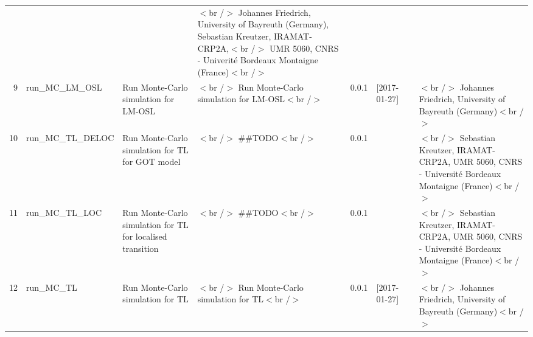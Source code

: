 \begin{table}[ht]
\begin{tabular}{rlllllll}
 &  &  & $<$br /$>$ Johannes Friedrich, University of Bayreuth (Germany), Sebastian Kreutzer, IRAMAT-CRP2A,$<$br /$>$ UMR 5060, CNRS - Univerité Bordeaux Montaigne (France)$<$br /$>$ \\ 
  9 & run\_MC\_LM\_OSL & Run Monte-Carlo simulation for LM-OSL & $<$br /$>$ Run Monte-Carlo simulation for LM-OSL$<$br /$>$ & 0.0.1 & [2017-01-27]
 &  & $<$br /$>$ Johannes Friedrich, University of Bayreuth (Germany)$<$br /$>$ \\ 
  10 & run\_MC\_TL\_DELOC & Run Monte-Carlo simulation for TL for GOT model & $<$br /$>$ \#\#TODO$<$br /$>$ & 0.0.1
 &  &  & $<$br /$>$ Sebastian Kreutzer, IRAMAT-CRP2A, UMR 5060, CNRS - Université Bordeaux Montaigne (France)$<$br /$>$ \\ 
  11 & run\_MC\_TL\_LOC & Run Monte-Carlo simulation for TL for localised transition & $<$br /$>$ \#\#TODO$<$br /$>$ & 0.0.1
 &  &  & $<$br /$>$ Sebastian Kreutzer, IRAMAT-CRP2A, UMR 5060, CNRS - Université Bordeaux Montaigne (France)$<$br /$>$ \\ 
  12 & run\_MC\_TL & Run Monte-Carlo simulation for TL & $<$br /$>$ Run Monte-Carlo simulation for TL$<$br /$>$ & 0.0.1 & [2017-01-27]
 &  & $<$br /$>$ Johannes Friedrich, University of Bayreuth (Germany)$<$br /$>$ \\ 
   \hline
\end{tabular}
\end{table}

